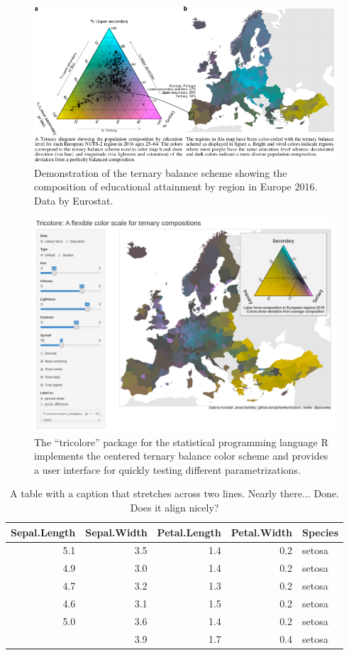 \documentclass[10pt,twoside,reqno]{article}
\makeatletter
\def\cnstmaxfigwidth{
      \ifdim \Gin@nat@width>\linewidth
        \linewidth
      \else \Gin@nat@width
      \fi
    }
\let\Oldincludegraphics\includegraphics
\renewcommand{\includegraphics}[1]{\Oldincludegraphics[width=\cnstmaxfigwidth]{#1}}
\makeatother
\begin{document}
\begin{figure}
\centering
\includegraphics{figure1.pdf}
\caption{\label{fig:unnamed-chunk-2}Demonstration of the ternary balance scheme showing the composition of educational attainment by region in Europe 2016. Data by Eurostat.}
\end{figure}

\begin{figure}
\centering
\includegraphics{figure2.png}
\caption{The ``tricolore'' package for the statistical programming language R implements the centered ternary balance color scheme and provides a user interface for quickly testing different parametrizations.}
\end{figure}

\begin{table}

\caption{\label{tab:unnamed-chunk-3}A table with a caption that stretches across two lines. Nearly there... Done. Does it align nicely?}
\centering
\begin{tabular}[t]{rrrrl}
\toprule
Sepal.Length & Sepal.Width & Petal.Length & Petal.Width & Species\\
\midrule
5.1 & 3.5 & 1.4 & 0.2 & setosa\\
4.9 & 3.0 & 1.4 & 0.2 & setosa\\
4.7 & 3.2 & 1.3 & 0.2 & setosa\\
4.6 & 3.1 & 1.5 & 0.2 & setosa\\
5.0 & 3.6 & 1.4 & 0.2 & setosa\\
\addlinespace
5.4 & 3.9 & 1.7 & 0.4 & setosa\\
\bottomrule
\end{tabular}
\end{table}
\end{document}
